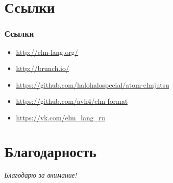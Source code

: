 \documentclass[11pt,aspectratio=169]{beamer}
\begin{document}
\section{Ссылки}

\begin{frame}
\frametitle{Ссылки}
\begin{itemize}
\item \url{http://elm-lang.org/}
\item \url{http://brunch.io/}
\item \url{https://github.com/halohalospecial/atom-elmjutsu}
\item \url{https://github.com/avh4/elm-format}
\item \url{https://vk.com/elm_lang_ru}
\end{itemize}
\end{frame}

\section*{Благодарность}

\begin{frame}
\center

\textit{Благодарю за внимание!}

\textbf{\textsl{\inserttitle}}

\insertauthor
\end{frame}
\end{document}
